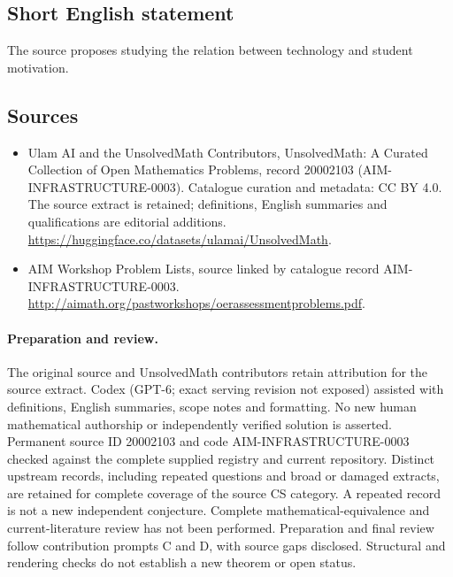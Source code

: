\documentclass[11pt]{article}
\begin{document}
\subsection{Short English statement}
The source proposes studying the relation between technology and student motivation.
\subsection{Sources}
\begin{itemize}
\item[\hypertarget{source:20002103:1}{S1}] Ulam AI and the UnsolvedMath Contributors, UnsolvedMath: A Curated Collection of Open Mathematics Problems, record 20002103 (AIM-INFRASTRUCTURE-0003). Catalogue curation and metadata: CC BY 4.0. The source extract is retained; definitions, English summaries and qualifications are editorial additions.
\url{https://huggingface.co/datasets/ulamai/UnsolvedMath}.
\item[\hypertarget{source:20002103:2}{S2}] AIM Workshop Problem Lists, source linked by catalogue record AIM-INFRASTRUCTURE-0003.
\url{http://aimath.org/pastworkshops/oerassessmentproblems.pdf}.
\end{itemize}
\paragraph{Preparation and review.}
The original source and UnsolvedMath contributors retain attribution for the source extract. Codex (GPT-6; exact serving revision not exposed) assisted with definitions, English summaries, scope notes and formatting. No new human mathematical authorship or independently verified solution is asserted. Permanent source ID 20002103 and code AIM-INFRASTRUCTURE-0003 checked against the complete supplied registry and current repository. Distinct upstream records, including repeated questions and broad or damaged extracts, are retained for complete coverage of the source CS category. A repeated record is not a new independent conjecture. Complete mathematical-equivalence and current-literature review has not been performed. Preparation and final review follow contribution prompts C and D, with source gaps disclosed. Structural and rendering checks do not establish a new theorem or open status.
\label{end:20002103}
\end{document}
